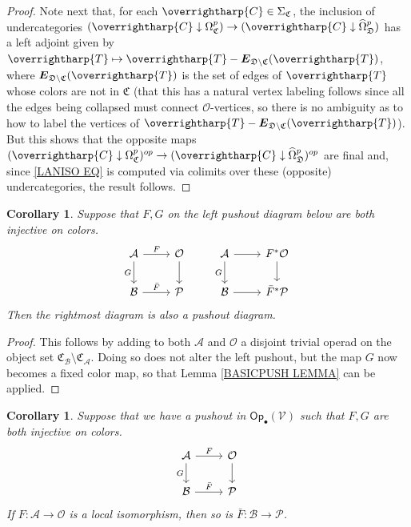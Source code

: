 \documentclass[a4paper,10pt
,draft
]{article}%
\numberwithin{equation}{section}
\numberwithin{figure}{section}
\newtheorem{corollary}[equation]{Corollary}%
\theoremstyle{definition} %
\newcommand{\vect}[1]{\text{\overrightharp{\ensuremath{#1}}}}
\newcommand{\Op}{\mathsf{Op}}%
\newcommand{\V}{\ensuremath{\mathcal V}}
\renewcommand{\O}{\ensuremath{\mathcal O}}
\renewcommand{\P}{\ensuremath{\mathcal P}}
\newcommand{\1}{\ensuremath{\mathbbm 1}}%
\begin{document}
\begin{proof}
	Note next that,
	for each $\vect{C} \in \Sigma_{\mathfrak{C}}$,
	the inclusion of undercategories
	$(\vect{C} \downarrow \Omega^p_{\mathfrak{C}})
	\to
	(\vect{C} \downarrow \widehat{\Omega}^p_{\mathfrak{D}})
	$
	has a left adjoint given by  
	$\vect{T} \mapsto \vect{T} - 
	\boldsymbol{E}_{\mathfrak{D} \setminus \mathfrak{C}}(\vect{T})$,
	where 
	$\boldsymbol{E}_{\mathfrak{D} \setminus \mathfrak{C}}(\vect{T})$
	is the set of edges of $\vect{T}$ whose colors are not in $\mathfrak{C}$
	(that this has a natural vertex labeling follows since all the edges being collapsed must connect $\mathcal{O}$-vertices, so there is no ambiguity as to how to label the vertices of $\vect{T} - \boldsymbol{E}_{\mathfrak{D} \setminus \mathfrak{C}}(\vect{T})$).
	But this shows that the opposite maps 
	$(\vect{C} \downarrow \Omega^p_{\mathfrak{C}})^{op}
	\to
	(\vect{C} \downarrow \widehat{\Omega}^p_{\mathfrak{D}})^{op}$
	are final and,
	since \eqref{LANISO EQ} is 
	computed via colimits over these (opposite) undercategories, the result follows.
\end{proof}


\begin{corollary}\label{FGTPUSH_COR}
	Suppose that $F,G$ on the left pushout diagram below are both injective on colors.
	\[
	\begin{tikzcd}
	\mathcal{A} \ar{r}{F} \ar{d}[swap]{G} & \mathcal{O} \ar{d}
	&
	\mathcal{A} \ar{r} \ar{d}[swap]{G} & F^{\**} \mathcal{O} \ar{d}
	\\
	\mathcal{B} \ar{r}{\bar{F}} & \mathcal{P}
	&
	\mathcal{B} \ar{r} & \bar{F}^{\**} \mathcal{P}
	\end{tikzcd}
	\]
	Then the rightmost diagram is also a pushout diagram.
\end{corollary}

\begin{proof}
	This follows by adding to both $\mathcal{A}$ and $\mathcal{O}$ a disjoint trivial operad on the object set
	$\mathfrak{C}_{\mathcal{B}} \setminus \mathfrak{C}_{\mathcal{A}}$.
	Doing so does not alter the left pushout,
	but the map $G$ now becomes a fixed color map,
	so that Lemma \ref{BASICPUSH LEMMA} can be applied.
\end{proof}



\begin{corollary}\label{LOCALISO_COR}
	Suppose that we have a pushout in $\Op_{\bullet}(\V)$ such that $F,G$ are both injective on colors.
	\[
	\begin{tikzcd}
	\mathcal{A} \arrow[d, "G"'] \arrow[r, "F"]
	&
	\O \arrow[d]
	\\
	\mathcal{B} \ar{r}{\bar{F}}
	&
	\P
	\end{tikzcd}
	\]
	If $F\colon \mathcal{A} \to \mathcal{O}$ is a local isomorphism, then so is $\bar{F} \colon \mathcal{B} \to \P$.
\end{corollary}
\end{document}
